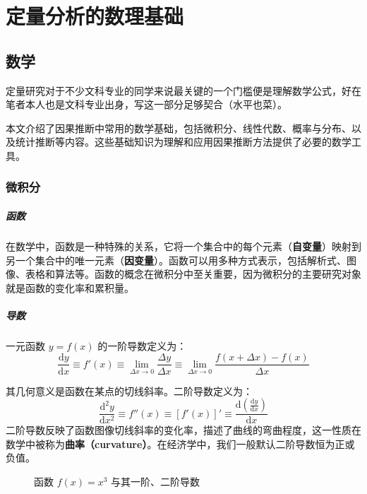 \chapter{定量分析的数理基础}

\section{数学}
定量研究对于不少文科专业的同学来说最关键的一个门槛便是理解数学公式，好在笔者本人也是文科专业出身，写这一部分足够契合（水平也菜）。

本文介绍了因果推断中常用的数学基础，包括微积分、线性代数、概率与分布、以及统计推断等内容。这些基础知识为理解和应用因果推断方法提供了必要的数学工具。

\subsection{微积分}

\paragraph*{函数}
在数学中，函数是一种特殊的关系，它将一个集合中的每个元素（\textbf{自变量}）映射到另一个集合中的唯一元素（\textbf{因变量}）。函数可以用多种方式表示，包括解析式、图像、表格和算法等。函数的概念在微积分中至关重要，因为微积分的主要研究对象就是函数的变化率和累积量。

\paragraph*{导数}
一元函数 $ y = f(x) $ 的一阶导数定义为：
\begin{equation}
\frac{\mathrm{d}y}{\mathrm{d}x} \equiv f'(x) \equiv \lim_{\Delta x \to 0} \frac{\Delta y}{\Delta x} \equiv \lim_{\Delta x \to 0} \frac{f(x + \Delta x) - f(x)}{\Delta x}
\end{equation}

\noindent 其几何意义是函数在某点的切线斜率。二阶导数定义为：
\begin{equation}
\frac{\mathrm{d}^2y}{\mathrm{d}x^2} \equiv f''(x) \equiv [f'(x)]'\equiv \frac{\mathrm{d}\left(\frac{\mathrm{d}y}{\mathrm{d}x}\right)}{\mathrm{d}x}
\end{equation}
\noindent 二阶导数反映了函数图像切线斜率的变化率，描述了曲线的弯曲程度，这一性质在数学中被称为\textbf{曲率（curvature）}。在经济学中，我们一般默认二阶导数恒为正或负值。

\begin{figure}[ht]
	\centering
	\caption{函数 $f(x) = x^3$ 与其一阶、二阶导数}
\end{figure}

